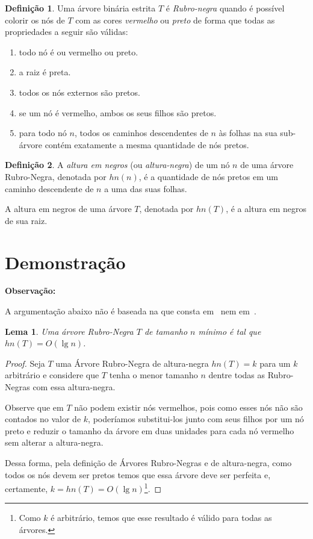 \documentclass[11pt,twoside]{article}
\newtheorem{lemma}[theorem]{Lema}
\theoremstyle{definition}
\newtheorem{definition}{Definição}[section]
\begin{document}
\begin{definition}
	Uma árvore binária estrita \( T \) é \emph{Rubro-negra} quando é possível colorir os nós de \( T \) com as cores \emph{vermelho} ou \emph{preto} de forma que todas as propriedades a seguir são válidas:
	\begin{enumerate}[label=(\alph*)]
		\item todo nó é ou vermelho ou preto.
		\item a raiz é preta.
		\item todos os nós externos são pretos.
		\item se um nó é vermelho, ambos os seus filhos são pretos.
		\item para todo nó \( n \), todos os caminhos descendentes de \( n \) às folhas na sua sub-árvore contém exatamente a mesma quantidade de nós pretos.
	\end{enumerate}
\end{definition}

\begin{definition}
	A \emph{altura em negros} (ou \emph{altura-negra}) de um nó \( n \) de uma árvore Rubro-Negra, denotada por \( hn(n) \), é a quantidade de nós pretos em um caminho descendente de \( n \) a uma das suas folhas.

	A altura em negros de uma árvore \( T \), denotada por \( hn(T) \), é a altura em negros de sua raiz.
\end{definition}

\section{Demonstração}

\begin{framed}
	{\bfseries Observação:}

	A argumentação abaixo não é baseada na que consta em~\textcite{Szwarcfiter2010} nem em~\textcite{Cormen2009}.
\end{framed}

\begin{lemma} \label{res:hn-min-lgn}
	Uma árvore Rubro-Negra \( T \) de tamanho \( n \) \emph{mínimo} é tal que \( hn(T) = O(\lg n) \).
\end{lemma}
\begin{proof}
	Seja \( T \) uma Árvore Rubro-Negra de altura-negra \( hn(T) = k \) para um \( k \) arbitrário e considere que \( T \) tenha o menor tamanho \( n \) dentre todas as Rubro-Negras com essa altura-negra.

	Observe que em \( T \) não podem existir nós vermelhos, pois como esses nós não são contados no valor de \( k \), poderíamos substitui-los junto com seus filhos por um nó preto e reduzir o tamanho da árvore em duas unidades para cada nó vermelho sem alterar a altura-negra. %

	Dessa forma, pela definição de Árvores Rubro-Negras e de altura-negra, como todos os nós devem ser pretos temos que essa árvore deve ser perfeita e, certamente, \( k = hn(T) = O(\lg n) \)\footnote{Como \( k \) é arbitrário, temos que esse resultado é válido para todas as árvores.}.
\end{proof}
\end{document}
